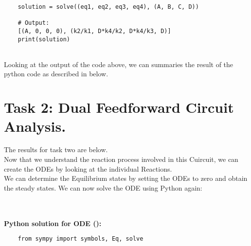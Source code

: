 \documentclass[11pt]{cls/labreport}
\begin{document}
\begin{multicols}{2}
{\begin{codebox}
\begin{lstlisting}
    solution = solve((eq1, eq2, eq3, eq4), (A, B, C, D))
    
    # Output:
    [(A, 0, 0, 0), (k2/k1, D*k4/k2, D*k4/k3, D)]
    print(solution)
   \end{lstlisting}
 \end{codebox}
 \noindent\parbox[t]{0.48\textwidth}{}\\
Looking at the output of the code above, we can summaries the result of the python code as described in  below.


\section{Task 2: Dual Feedforward Circuit Analysis.}
\twocolend
The results for task two are below.
\\
Now that we understand the reaction process involved in this Cuircuit, we can create the ODEs by looking at the individual Reactions.
\\
\twocolstart
We can determine the Equilibrium states by setting the ODEs to zero and obtain the steady states.
We can now solve the ODE using Python again:\\
\twocolend
\begin{codebox}
    \\
    \\ %
    \textbf{Python solution for ODE ():}  
    \begin{lstlisting}
    from sympy import symbols, Eq, solve


\end{lstlisting}
\end{codebox}}
\end{multicols}
\end{document}
